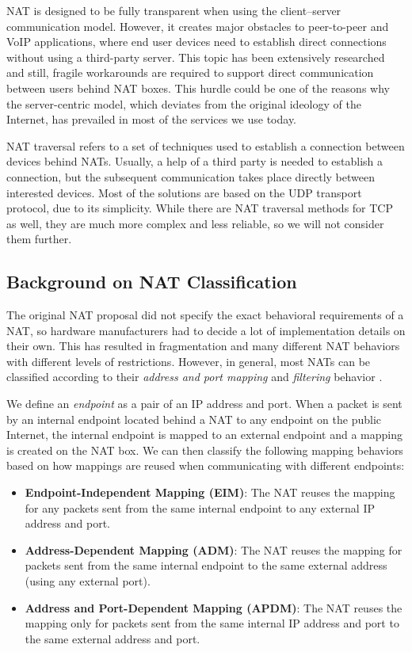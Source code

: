 NAT is designed to be fully transparent when using the client–server communication model. However, it creates major obstacles to peer-to-peer and VoIP applications, where end user devices need to establish direct connections without using a third-party server. This topic has been extensively researched and still, fragile workarounds are required to support direct communication between users behind NAT boxes. This hurdle could be one of the reasons why the server-centric model, which deviates from the original ideology of the Internet, has prevailed in most of the services we use today.

NAT traversal refers to a set of techniques used to establish a connection between devices behind NATs. Usually, a help of a third party is needed to establish a connection, but the subsequent communication takes place directly between interested devices.
Most of the solutions are based on the UDP transport protocol, due to its simplicity. While there are NAT traversal methods for TCP as well, they are much more complex and less reliable, so we will not consider them further.

\subsection{Background on NAT Classification}
\label{nat-classification}


The original NAT proposal did not specify the exact behavioral requirements of a NAT, so hardware manufacturers had to decide a lot of implementation details on their own. This has resulted in fragmentation and many different NAT behaviors with different levels of restrictions. However, in general, most NATs can be classified according to their \textit{address and port mapping} and \textit{filtering} behavior \cite{behave}.

We define an \textit{endpoint} as a pair of an IP address and port. When a packet is sent by an internal endpoint located behind a NAT to any endpoint on the public Internet, the internal endpoint is mapped to an external endpoint and a mapping is created on the NAT box. We can then classify the following mapping behaviors based on how mappings are reused when communicating with different endpoints:

\begin{itemize}
    \item \textbf{Endpoint-Independent Mapping (EIM)}: The NAT reuses the mapping for any packets sent from the same internal endpoint to any external IP address and port.
    \item \textbf{Address-Dependent Mapping (ADM)}: The NAT reuses the mapping for packets sent from the same internal endpoint to the same external address (using any external port).
    \item \textbf{Address and Port-Dependent Mapping (APDM)}: The NAT reuses the mapping only for packets sent from the same internal IP address and port to the same external address and port.
\end{itemize}


